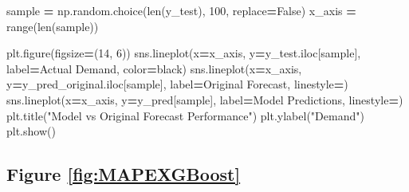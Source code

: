 \documentclass[mstat,12pt]{unswthesis}
\newenvironment{Shaded}{\begin{snugshade}}{\end{snugshade}}
\newcommand{\BuiltInTok}[1]{#1}
\newcommand{\DecValTok}[1]{\textcolor[rgb]{0.00,0.00,0.81}{#1}}
\newcommand{\NormalTok}[1]{#1}
\newcommand{\OperatorTok}[1]{\textcolor[rgb]{0.81,0.36,0.00}{\textbf{#1}}}
\newcommand{\StringTok}[1]{\textcolor[rgb]{0.31,0.60,0.02}{#1}}
\newcommand{\VariableTok}[1]{\textcolor[rgb]{0.00,0.00,0.00}{#1}}
\begin{document}
\begin{Shaded}
\begin{Highlighting}[]
\NormalTok{sample }\OperatorTok{=}\NormalTok{ np.random.choice(}\BuiltInTok{len}\NormalTok{(y\_test), }\DecValTok{100}\NormalTok{, replace}\OperatorTok{=}\VariableTok{False}\NormalTok{)}
\NormalTok{x\_axis }\OperatorTok{=} \BuiltInTok{range}\NormalTok{(}\BuiltInTok{len}\NormalTok{(sample))}

\NormalTok{plt.figure(figsize}\OperatorTok{=}\NormalTok{(}\DecValTok{14}\NormalTok{, }\DecValTok{6}\NormalTok{))}
\NormalTok{sns.lineplot(x}\OperatorTok{=}\NormalTok{x\_axis, y}\OperatorTok{=}\NormalTok{y\_test.iloc[sample], }
\NormalTok{    label}\OperatorTok{=}\StringTok{\textquotesingle{}Actual Demand\textquotesingle{}}\NormalTok{, color}\OperatorTok{=}\StringTok{\textquotesingle{}black\textquotesingle{}}\NormalTok{)}
\NormalTok{sns.lineplot(x}\OperatorTok{=}\NormalTok{x\_axis, y}\OperatorTok{=}\NormalTok{y\_pred\_original.iloc[sample], }
\NormalTok{    label}\OperatorTok{=}\StringTok{\textquotesingle{}Original Forecast\textquotesingle{}}\NormalTok{, linestyle}\OperatorTok{=}\StringTok{\textquotesingle{}{-}{-}\textquotesingle{}}\NormalTok{)}
\NormalTok{sns.lineplot(x}\OperatorTok{=}\NormalTok{x\_axis, y}\OperatorTok{=}\NormalTok{y\_pred[sample], }
\NormalTok{    label}\OperatorTok{=}\StringTok{\textquotesingle{}Model Predictions\textquotesingle{}}\NormalTok{, linestyle}\OperatorTok{=}\StringTok{\textquotesingle{}{-}{-}\textquotesingle{}}\NormalTok{)}
\NormalTok{plt.title(}\StringTok{"Model vs Original Forecast Performance"}\NormalTok{)}
\NormalTok{plt.ylabel(}\StringTok{"Demand"}\NormalTok{)}
\NormalTok{plt.show()}
\end{Highlighting}
\end{Shaded}

\subsection*{Figure \ref{fig:MAPEXGBoost}}\label{figure-reffigmapexgboost}
\end{document}
